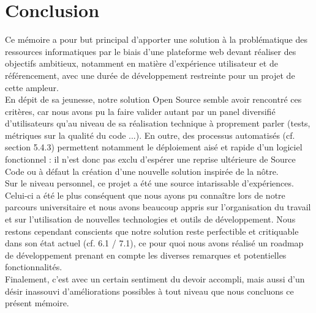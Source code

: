 \chapter{Conclusion}

Ce mémoire a pour but principal d’apporter une solution à la problématique des ressources informatiques par le biais d’une plateforme web devant réaliser des objectifs ambitieux, notamment en matière d’expérience utilisateur et de référencement, avec une durée de développement restreinte pour un projet de cette ampleur. \\

En dépit de sa jeunesse, notre solution Open Source semble avoir rencontré ces critères, car nous avons pu la faire valider autant par un panel diversifié d’utilisateurs qu’au niveau de sa réalisation technique à proprement parler (tests, métriques sur la qualité du code ...). En outre, des processus automatisés (cf. section 5.4.3) permettent notamment le déploiement aisé et rapide d’un logiciel fonctionnel : il n’est donc pas exclu d’espérer une reprise ultérieure de Source Code ou à défaut la création d’une nouvelle solution inspirée de la nôtre. \\

Sur le niveau personnel, ce projet a été une source intarissable d’expériences. Celui-ci a été le plus conséquent que nous ayons pu connaître lors de notre parcours universitaire et nous avons beaucoup appris sur l’organisation du travail et sur l’utilisation de nouvelles technologies et outils de développement. Nous restons cependant conscients que notre solution reste perfectible et critiquable dans son état actuel (cf. 6.1 / 7.1), ce pour quoi nous avons réalisé un roadmap de développement prenant en compte les diverses remarques et potentielles fonctionnalités. \\

Finalement, c'est avec un certain sentiment du devoir accompli, mais aussi d'un désir inassouvi d'améliorations possibles à tout niveau que nous concluons ce présent mémoire. 
